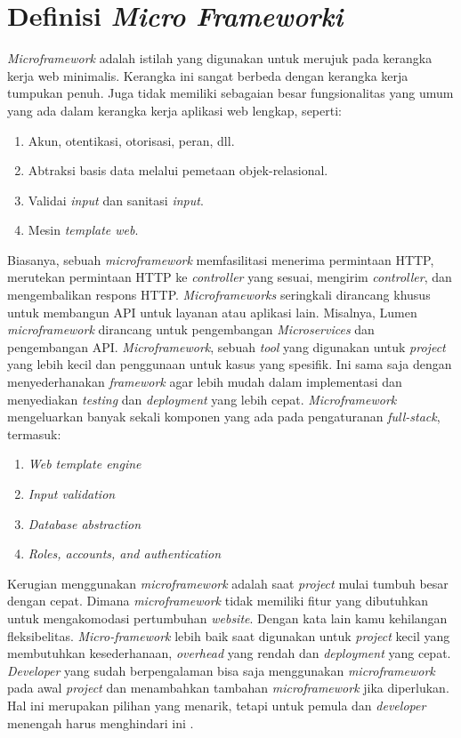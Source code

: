 \section{Definisi \textit{Micro Frameworki}}

\textit{Microframework} adalah istilah yang digunakan untuk merujuk pada kerangka kerja web minimalis. Kerangka ini sangat berbeda dengan kerangka kerja tumpukan penuh. Juga tidak memiliki sebagaian besar fungsionalitas yang umum yang ada dalam kerangka kerja aplikasi web lengkap, seperti:
\begin{enumerate}
\item Akun, otentikasi, otorisasi, peran, dll.
\item Abtraksi basis data melalui pemetaan objek-relasional.
\item Validai  \textit{input} dan sanitasi \textit{input}.
\item Mesin \textit{template web}.
\end{enumerate}

Biasanya, sebuah \textit{microframework} memfasilitasi menerima permintaan HTTP, merutekan permintaan HTTP ke \textit{controller} yang sesuai, mengirim \textit{controller}, dan mengembalikan respons HTTP. \textit{Microframeworks} seringkali dirancang khusus untuk membangun API untuk layanan atau aplikasi lain. Misalnya, Lumen \textit{microframework} dirancang untuk pengembangan \textit{Microservices} dan pengembangan API. \textit{Microframework}, sebuah \textit{tool} yang digunakan untuk \textit{project} yang lebih kecil dan penggunaan untuk kasus yang spesifik. Ini sama saja dengan menyederhanakan \textit{framework} agar lebih mudah dalam implementasi dan menyediakan \textit{testing} dan \textit{deployment} yang lebih cepat. \textit{Microframework} mengeluarkan banyak sekali komponen yang ada pada pengaturanan \textit{full-stack}, termasuk:
\begin{enumerate}
\item \textit{Web template engine}
\item \textit{Input validation}
\item \textit{Database abstraction}
\item \textit{Roles, accounts, and authentication}
\end{enumerate}

Kerugian menggunakan  \textit{microframework} adalah saat  \textit{project} mulai tumbuh besar dengan cepat. Dimana  \textit{microframework} tidak memiliki fitur yang dibutuhkan untuk mengakomodasi pertumbuhan  \textit{website}. Dengan kata lain kamu kehilangan fleksibelitas.  \textit{Micro-framework} lebih baik saat digunakan untuk  \textit{project} kecil yang membutuhkan kesederhanaan,  \textit{overhead} yang rendah dan  \textit{deployment} yang cepat.  \textit{Developer} yang sudah berpengalaman bisa saja menggunakan  \textit{microframework} pada awal  \textit{project} dan menambahkan tambahan  \textit{microframework} jika diperlukan. Hal ini merupakan pilihan yang menarik, tetapi untuk pemula dan  \textit{developer} menengah harus menghindari ini \cite{fadhilnet}.

